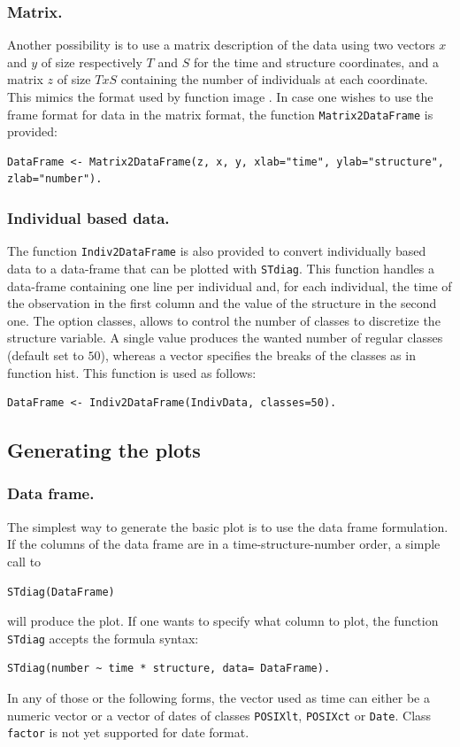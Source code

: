 \subsubsection{Matrix.}
Another possibility is to use a matrix description of the data using two vectors
$x$ and $y$ of size respectively $T$ and $S$ for the time and structure
coordinates, and a matrix $z$ of size $TxS$ containing the number of individuals
at each coordinate. This mimics the format used by function image \autocites{team2012a}.
In case one wishes to use the frame format for data in the matrix format, the
function \texttt{Matrix2DataFrame} is provided:
\begin{verbatim}
DataFrame <- Matrix2DataFrame(z, x, y, xlab="time", ylab="structure",
zlab="number").
\end{verbatim}

\subsubsection{Individual based data.}
The function \texttt{Indiv2DataFrame} is also provided to convert
individually based data to a data-frame that can be plotted with \texttt{STdiag}. This function handles a
data-frame containing one line per individual and, for each individual, the time
of the observation in the first column and the value of the structure in the
second one. The option classes, allows to control the number of classes to
discretize the structure variable. A single value produces the wanted number of
regular classes (default set to $50$), whereas a vector specifies the breaks of
the classes as in function hist. This function is used as follows:
\begin{verbatim}
DataFrame <- Indiv2DataFrame(IndivData, classes=50).
\end{verbatim}

\subsection{Generating the plots}

\subsubsection{Data frame.}
The simplest way to generate the basic plot is to use the data frame
formulation. If the columns of the data frame are in a time-structure-number
order, a simple call to
\begin{verbatim}
STdiag(DataFrame)
\end{verbatim}
will produce the plot. If one wants to specify what column to plot, the function
\texttt{STdiag} accepts the formula syntax:
\begin{verbatim}
STdiag(number ~ time * structure, data= DataFrame).
\end{verbatim}
In any of those or the following forms, the vector used as time can either be a
numeric vector or a vector of dates of classes \texttt{POSIXlt},
\texttt{POSIXct} or \texttt{Date}. Class \texttt{factor} is not yet supported
for date format.

